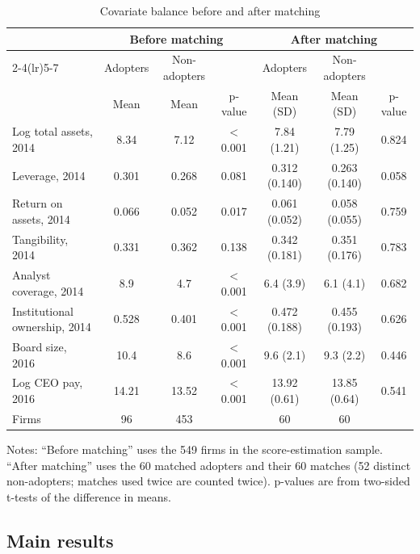 \documentclass[11pt]{article}
\begin{document}
\begin{table}[!htbp]
\centering
\begin{threeparttable}
\caption{Covariate balance before and after matching}
\label{tab:balance}
\footnotesize\setlength{\tabcolsep}{4pt}
\begin{tabular}{lccc@{\hspace{1.5em}}ccc}
\toprule
 & \multicolumn{3}{c}{Before matching} & \multicolumn{3}{c}{After matching} \\
\cmidrule(lr){2-4}\cmidrule(lr){5-7}
 & Adopters & Non-adopters & & Adopters & Non-adopters & \\
 & Mean & Mean & p-value & Mean (SD) & Mean (SD) & p-value \\
\midrule
Log total assets, 2014 & 8.34 & 7.12 & $<$0.001 & 7.84 (1.21) & 7.79 (1.25) & 0.824 \\
Leverage, 2014 & 0.301 & 0.268 & 0.081 & 0.312 (0.140) & 0.263 (0.140) & 0.058 \\
Return on assets, 2014 & 0.066 & 0.052 & 0.017 & 0.061 (0.052) & 0.058 (0.055) & 0.759 \\
Tangibility, 2014 & 0.331 & 0.362 & 0.138 & 0.342 (0.181) & 0.351 (0.176) & 0.783 \\
Analyst coverage, 2014 & 8.9 & 4.7 & $<$0.001 & 6.4 (3.9) & 6.1 (4.1) & 0.682 \\
Institutional ownership, 2014 & 0.528 & 0.401 & $<$0.001 & 0.472 (0.188) & 0.455 (0.193) & 0.626 \\
Board size, 2016 & 10.4 & 8.6 & $<$0.001 & 9.6 (2.1) & 9.3 (2.2) & 0.446 \\
Log CEO pay, 2016 & 14.21 & 13.52 & $<$0.001 & 13.92 (0.61) & 13.85 (0.64) & 0.541 \\
\midrule
Firms & 96 & 453 & & 60 & 60 & \\
\bottomrule
\end{tabular}
\begin{tablenotes}\footnotesize
\item Notes: ``Before matching'' uses the 549 firms in the score-estimation sample. ``After matching'' uses the 60 matched adopters and their 60 matches (52 distinct non-adopters; matches used twice are counted twice). p-values are from two-sided t-tests of the difference in means.
\end{tablenotes}
\end{threeparttable}
\end{table}

\subsection{Main results}
\end{document}

